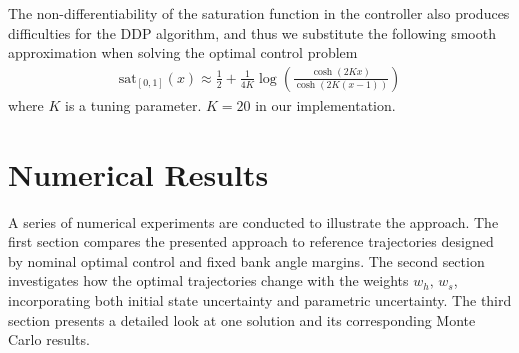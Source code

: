 \documentclass[journal ]{new-aiaa}
\begin{document}
The non-differentiability of the saturation function in the controller also produces difficulties for the DDP algorithm, and thus we substitute the following smooth approximation when solving the optimal control problem
\begin{align*}
\mathrm{sat}_{[0,1]}(x) \approx \frac{1}{2} + \frac{1}{4K}\log\left(\frac{\cosh (2Kx)}{\cosh (2K(x-1))}\right) 
\end{align*}
where $K$ is a tuning parameter. $K=20$ in our implementation.


\section*{Numerical Results}
A series of numerical experiments are conducted to illustrate the approach. The first section compares the presented approach to reference trajectories designed by nominal optimal control and fixed bank angle margins. The second section investigates how the optimal trajectories change with the weights $w_h,\,w_s$, incorporating both initial state uncertainty and parametric uncertainty. The third section presents a detailed look at one solution and its corresponding Monte Carlo results.
\end{document}
